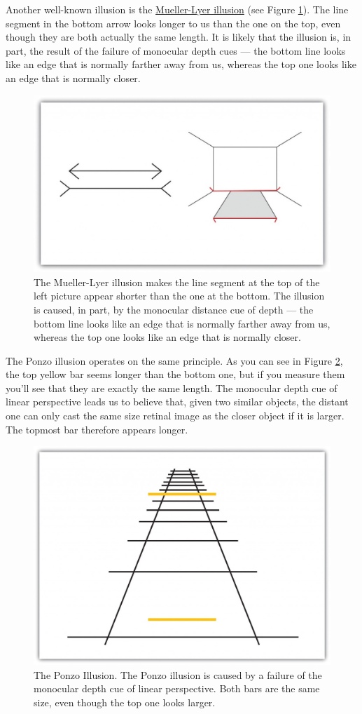 \documentclass[
]{krantz}
\begin{document}
Another well-known illusion is the \protect\hyperlink{mueller-lyer-illusion}{Mueller-Lyer illusion} (see Figure \ref{fig:muellerlyer}). The line segment in the bottom arrow looks longer to us than the one on the top, even though they are both actually the same length. It is likely that the illusion is, in part, the result of the failure of monocular depth cues --- the bottom line looks like an edge that is normally farther away from us, whereas the top one looks like an edge that is normally closer.

\begin{figure}

{\centering \includegraphics[width=0.6\linewidth]{images/ch2/fig5} 

}

\caption{The Mueller-Lyer illusion makes the line segment at the top of the left picture appear shorter than the one at the bottom. The illusion is caused, in part, by the monocular distance cue of depth — the bottom line looks like an edge that is normally farther away from us, whereas the top one looks like an edge that is normally closer.}\label{fig:muellerlyer}
\end{figure}

The Ponzo illusion operates on the same principle. As you can see in Figure \ref{fig:ponzoillusion}, the top yellow bar seems longer than the bottom one, but if you measure them you'll see that they are exactly the same length. The monocular depth cue of linear perspective leads us to believe that, given two similar objects, the distant one can only cast the same size retinal image as the closer object if it is larger. The topmost bar therefore appears longer.

\begin{figure}

{\centering \includegraphics[width=0.6\linewidth]{images/ch2/fig7} 

}

\caption{The Ponzo Illusion. The Ponzo illusion is caused by a failure of the monocular depth cue of linear perspective. Both bars are the same size, even though the top one looks larger.}\label{fig:ponzoillusion}
\end{figure}
\end{document}

